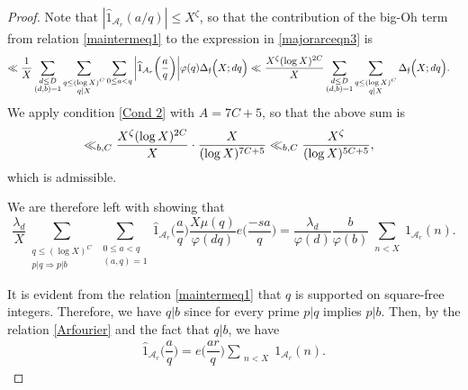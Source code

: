 \documentclass[12pt]{amsart}
\numberwithin{equation}{section}
\theoremstyle{remark}
\theoremstyle{definition}
\begin{document}
\begin{proof}
Note that $|\widehat{1}_{\mathcal{A}_r}(a/q)| \leq X^{\zeta}$, so that the contribution of the big-Oh term from relation \eqref{maintermeq1} to the expression in  \eqref{majorarceqn3} is
\begin{align}
\notag \ll \dfrac{1}{X}\sum_{\substack{d \leq D\\(d,b)=1}}\sum_{\substack{q\leq (\log X)^C\\q|X}}\sum_{0\leq a <q}\bigg \lvert \widehat{1}_{\mathcal{A}_r}\bigg(\dfrac{a}{q}\bigg)\bigg \rvert\varphi(q)\Delta_{\mathfrak{f}}\Big(X; dq\Big)\ll &~\dfrac{X^{\zeta}(\log X)^{2C}}{X}\sum_{\substack{d\leq D\\(d,b)=1}}\sum_{\substack{q\leq (\log X)^C\\q|X}}\Delta_{\mathfrak{f}}\Big(X;dq\Big).
\end{align}
We apply condition \ref{Cond 2} with $A=7C+5$, so that the above sum is
\begin{align}
\notag & \ll_{b, C}  \dfrac{X^{\zeta}(\log X)^{2C}}{X}\cdot \dfrac{X}{(\log X)^{7C+5}} \ll_{b, C} \dfrac{X^\zeta}{(\log X)^{5C+5}},
\end{align}
which is admissible.

We are therefore left with showing that
\[\dfrac{\lambda_d}{X}\sum_{\substack{q \leq (\log X)^C\\p|q\Rightarrow p|b}}\sum_{\substack{0\leq a<q\\(a,q)=1}}\widehat{1}_{\mathcal{A}_r}\bigg(\dfrac{a}{q}\bigg)\dfrac{X\mu(q)}{\varphi(dq)}e\bigg(\dfrac{-sa}{q}\bigg) = \dfrac{\lambda_d}{\varphi(d)}\dfrac{b}{\varphi(b)}\sum_{\substack{n<X}}1_{\mathcal{A}_r}(n).\]


It is evident from the relation \eqref{maintermeq1} that $q$ is supported on square-free integers. Therefore, we have $q|b$ since for every prime $p|q$ implies $p|b$. Then, by the relation \eqref{Arfourier} and the fact that $q|b$, we have
\begin{align}
\label{maintermeq2}\widehat{1}_{\mathcal{A}_r}\bigg(\dfrac{a}{q}\bigg) =e\bigg(\dfrac{ar}{q}\bigg)\sum_{\substack{n< X}}1_{\mathcal{A}_r}(n).
\end{align}


\end{proof}
\end{document}
